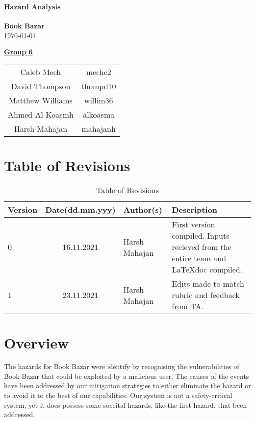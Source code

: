 \documentclass[fullpage]{article}
\begin{document}
\vspace*{\fill}
\begin{center}

  {\Huge \textbf{Hazard Analysis}}\\
\hrulefill\\[2mm]
  {\huge \textbf{Book Bazar}}\\[2mm]
{\large \today}\\[15mm]
{\large
\underline{\textbf{Group 6}}\\
\begin{tabular}{ c c }

 Caleb Mech & mechc2\\ 
 David Thompson & thompd10\\
 Matthew Williams & willim36\\
 Ahmed Al Koasmh & alkoasma\\
 Harsh Mahajan	& mahajanh    
\end{tabular}
}

\end{center}

\vspace*{\fill}

\newpage
\begingroup
\hypersetup{hidelinks}
\tableofcontents

\listoftables
\endgroup
\newpage


\section*{Table of Revisions}
\begin{table}[h]
\centering
\begin{tabular}{| l | c | p{4cm}| p{5cm}|}
\hline
 \rowcolor{lightgray} 
\textbf{Version} & \textbf{Date(dd.mm.yyy)} &\textbf{Author(s)} &\textbf{Description}\\
\hline
0 & 16.11.2021 &  Harsh Mahajan & First version compiled. Inputs recieved from the entire team and \LaTeX doc compiled.\\
\hline
1 & 23.11.2021 &  Harsh Mahajan & Edits made to match rubric and feedback from TA.\\
\hline
\end{tabular}
\caption{Table of Revisions}

\end{table}

\section{Overview}
The hazards for Book Bazar were identify by recognising the vulnerabilities of Book Bazar that could be exploited by a malicious user. The causes of the events have been addressed by our mitigation strategies to either eliminate the hazard or to avoid it to the best of our capabilities. Our system is not a safety-critical system, yet it does possess some soceital hazards, like the first hazard, that been addressed. \\
\end{document}
